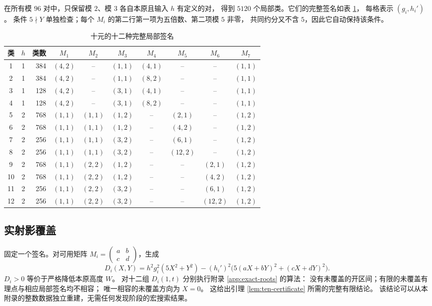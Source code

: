 \documentclass[UTF8,fontset=fandol,zihao=-4,a4paper]{ctexart}
\numberwithin{equation}{section}
\theoremstyle{definition}
\newcommand{\mat}[4]{\begin{pmatrix}#1&#2\\#3&#4\end{pmatrix}}
\begin{document}
在所有模 $96$ 对中，只保留模 $2$、模 $3$ 各自本原且输入 $h$ 有定义的对，
得到 $5120$ 个局部类。它们的完整签名如表 \ref{tab:ten-signatures}，
每格表示 $(g_i,h_i')$。
条件 $5\nmid Y$ 单独检查；每个 $M_i$ 的第二行第一项为五倍数、第二项模 $5$ 非零，
共同约分又不含 $5$，因此它自动保持该条件。

\begin{table}[htbp]
\centering\small
\setlength{\tabcolsep}{4.5pt}
\caption{十元的十二种完整局部签名}\label{tab:ten-signatures}
\begin{tabular}{ccrccccccc}
\toprule
类&$h$&类数&$M_1$&$M_2$&$M_3$&$M_4$&$M_5$&$M_6$&$M_7$\\
\midrule
1&1&384&$(4,2)$&--&$(1,1)$&$(4,1)$&--&--&$(1,1)$\\
2&1&384&$(4,2)$&--&$(1,1)$&$(8,2)$&--&--&$(1,1)$\\
3&1&128&$(4,2)$&--&$(3,1)$&$(4,1)$&--&--&$(1,1)$\\
4&1&128&$(4,2)$&--&$(3,1)$&$(8,2)$&--&--&$(1,1)$\\
5&2&768&$(1,1)$&$(1,1)$&$(1,2)$&--&$(2,1)$&--&$(1,2)$\\
6&2&768&$(1,1)$&$(1,1)$&$(1,2)$&--&$(4,2)$&--&$(1,2)$\\
7&2&256&$(1,1)$&$(1,1)$&$(3,2)$&--&$(6,1)$&--&$(1,2)$\\
8&2&256&$(1,1)$&$(1,1)$&$(3,2)$&--&$(12,2)$&--&$(1,2)$\\
9&2&768&$(1,1)$&$(2,2)$&$(1,2)$&--&--&$(2,1)$&$(1,2)$\\
10&2&768&$(1,1)$&$(2,2)$&$(1,2)$&--&--&$(4,2)$&$(1,2)$\\
11&2&256&$(1,1)$&$(2,2)$&$(3,2)$&--&--&$(6,1)$&$(1,2)$\\
12&2&256&$(1,1)$&$(2,2)$&$(3,2)$&--&--&$(12,2)$&$(1,2)$\\
\bottomrule
\end{tabular}
\end{table}

\subsection{实射影覆盖}

固定一个签名。对可用矩阵 $M_i=\mat{a}{b}{c}{d}$，生成
\begin{equation}\label{eq:ten-D}
 D_i(X,Y)=h^2g_i^2(5X^2+Y^2)
 -(h_i')^2\bigl(5(aX+bY)^2+(cX+dY)^2\bigr).
\end{equation}
$D_i>0$ 等价于严格降低本原高度 $W$。
对十二组 $D_i(1,t)$ 分别执行附录 \ref{app:exact-roots} 的算法：
没有未覆盖的开区间；有限的未覆盖有理点与相应局部签名均不相容；
唯一相容的未覆盖方向为 $X=0$。
这给出引理 \ref{lem:ten-certificate} 所需的完整有限结论。
该结论可以从本附录的整数数据独立重建，无需任何发现阶段的宏搜索结果。
\end{document}
